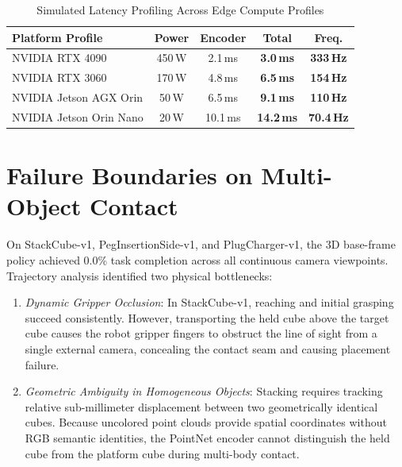 \documentclass[conference]{IEEEtran}
\begin{document}
\begin{table}[t]
\caption{Simulated Latency Profiling Across Edge Compute Profiles}
\begin{center}
\begin{tabular}{lcccc}
\toprule
\textbf{Platform Profile} & \textbf{Power} & \textbf{Encoder} & \textbf{Total} & \textbf{Freq.} \\
\midrule
NVIDIA RTX 4090 & 450\,W & 2.1\,ms & \textbf{3.0\,ms} & \textbf{333\,Hz} \\
NVIDIA RTX 3060 & 170\,W & 4.8\,ms & \textbf{6.5\,ms} & \textbf{154\,Hz} \\
NVIDIA Jetson AGX Orin & 50\,W & 6.5\,ms & \textbf{9.1\,ms} & \textbf{110\,Hz} \\
NVIDIA Jetson Orin Nano & 20\,W & 10.1\,ms & \textbf{14.2\,ms} & \textbf{70.4\,Hz} \\
\bottomrule
\end{tabular}
\label{tab_edge}
\end{center}
\end{table}

\section{Failure Boundaries on Multi-Object Contact}
On StackCube-v1, PegInsertionSide-v1, and PlugCharger-v1, the 3D base-frame policy achieved 0.0\% task completion across all continuous camera viewpoints. Trajectory analysis identified two physical bottlenecks:
\begin{enumerate}
\item \textit{Dynamic Gripper Occlusion}: In StackCube-v1, reaching and initial grasping succeed consistently. However, transporting the held cube above the target cube causes the robot gripper fingers to obstruct the line of sight from a single external camera, concealing the contact seam and causing placement failure.
\item \textit{Geometric Ambiguity in Homogeneous Objects}: Stacking requires tracking relative sub-millimeter displacement between two geometrically identical cubes. Because uncolored point clouds provide spatial coordinates without RGB semantic identities, the PointNet encoder cannot distinguish the held cube from the platform cube during multi-body contact.
\end{enumerate}
\end{document}
